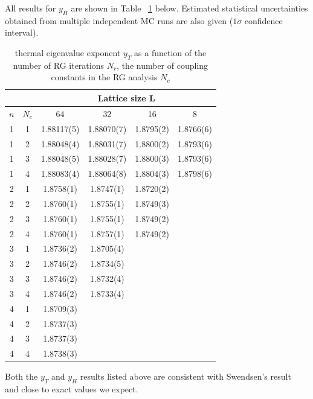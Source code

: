 \documentclass[12pt]{article}
\begin{document}
All results for $y_H$ are shown in Table ~\ref{yH} below. Estimated statistical uncertainties obtained from multiple independent MC runs are also given ($1\sigma$ confidence interval).

\begin{table}[H]
\centering
\begin{tabular}{|c|c|c|c|c|c|} 
\hline
 \multicolumn{2}{|c|}{ }& \multicolumn{4}{c|}{Lattice size L}\\
 \hline
 $n$ & $N_c$ & 64 & 32 & 16 & 8 \\
 \hline
 1 & 1 & 1.88117(5) & 1.88070(7) & 1.8795(2) & 1.8766(6) \\
 1 & 2 & 1.88048(4) & 1.88031(7) & 1.8800(2) & 1.8793(6)\\
 1 & 3 & 1.88048(5) & 1.88028(7) & 1.8800(3) & 1.8793(6)\\
 1 & 4 & 1.88083(4) & 1.88064(8) & 1.8804(3) & 1.8798(6)\\
 \hline
 2 & 1 & 1.8758(1) & 1.8747(1) & 1.8720(2)& \\
 2 & 2 & 1.8760(1) & 1.8755(1) & 1.8749(3)& \\
 2 & 3 & 1.8760(1) & 1.8755(1) & 1.8749(2)& \\
 2 & 4 & 1.8760(1) & 1.8757(1) & 1.8749(2)& \\
 \hline
 3 & 1 & 1.8736(2) & 1.8705(4)& & \\
 3 & 2 & 1.8746(2) & 1.8734(5)& & \\
 3 & 3 & 1.8746(2) & 1.8732(4)& &\\
 3 & 4 & 1.8746(2) & 1.8733(4)& & \\
 \hline
 4 & 1 & 1.8709(3) & & & \\
 4 & 2 & 1.8737(3) & & & \\
 4 & 3 & 1.8737(3) & & &\\
 4 & 4 & 1.8738(3) & & & \\
 \hline
 \end{tabular}
 \caption{\label{yH}thermal eigenvalue
exponent $y_T$ as a function of the number of RG iterations $N_r$, the number of coupling
constants in the RG analysis $N_c$}
\end{table}

Both the $y_T$ and $y_H$ results listed above are consistent with Swendsen's result~\cite{SwendsenDetail} and close to exact values we expect. 
\end{document}
